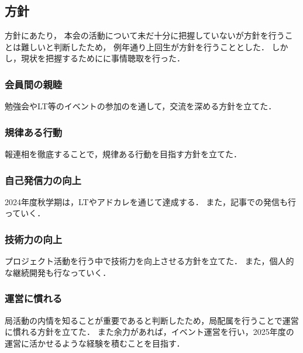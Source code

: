 \subsection*{\firstGrade{}方針}


\firstGrade{}方針にあたり，
本会の活動について未だ十分に把握していない\firstGrade{}が方針を行うことは難しいと判断したため，
例年通り上回生が方針を行うこととした．
しかし，現状を把握するために\firstGrade{}に事情聴取を行った．

\subsubsection*{会員間の親睦}
勉強会やLT等のイベントの参加のを通して，交流を深める方針を立てた．


\subsubsection*{規律ある行動}
報連相を徹底することで，規律ある行動を目指す方針を立てた．

\subsubsection*{自己発信力の向上}
2024年度秋学期は，LTやアドカレを通じて達成する．
また，記事での発信も行っていく．

\subsubsection*{技術力の向上}
プロジェクト活動を行う中で技術力を向上させる方針を立てた．
また，個人的な継続開発も行なっていく．

\subsubsection*{運営に慣れる}
局活動の内情を知ることが重要であると判断したため，局配属を行うことで運営に慣れる方針を立てた．
また余力があれば，イベント運営を行い，2025年度の運営に活かせるような経験を積むことを目指す．
